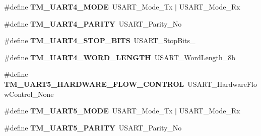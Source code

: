 \begin{DoxyCompactItemize}
\item 
\hypertarget{group___t_m___u_s_a_r_t___macros_gab965f7914474975c85cd58c8ab3790a9}{}\#define {\bfseries T\+M\+\_\+\+U\+A\+R\+T4\+\_\+\+M\+O\+D\+E}~U\+S\+A\+R\+T\+\_\+\+Mode\+\_\+\+Tx $\vert$ U\+S\+A\+R\+T\+\_\+\+Mode\+\_\+\+Rx\label{group___t_m___u_s_a_r_t___macros_gab965f7914474975c85cd58c8ab3790a9}

\item 
\hypertarget{group___t_m___u_s_a_r_t___macros_ga2fe6f1c08aaeb5dfda62a1fc4d25a4b3}{}\#define {\bfseries T\+M\+\_\+\+U\+A\+R\+T4\+\_\+\+P\+A\+R\+I\+T\+Y}~U\+S\+A\+R\+T\+\_\+\+Parity\+\_\+\+No\label{group___t_m___u_s_a_r_t___macros_ga2fe6f1c08aaeb5dfda62a1fc4d25a4b3}

\item 
\hypertarget{group___t_m___u_s_a_r_t___macros_gaf592ce1e1bf24325c1571dfbfc2dfe7e}{}\#define {\bfseries T\+M\+\_\+\+U\+A\+R\+T4\+\_\+\+S\+T\+O\+P\+\_\+\+B\+I\+T\+S}~U\+S\+A\+R\+T\+\_\+\+Stop\+Bits\+\_\label{group___t_m___u_s_a_r_t___macros_gaf592ce1e1bf24325c1571dfbfc2dfe7e}

\item 
\hypertarget{group___t_m___u_s_a_r_t___macros_ga625f045d7946725cf75b3b4df514a0bc}{}\#define {\bfseries T\+M\+\_\+\+U\+A\+R\+T4\+\_\+\+W\+O\+R\+D\+\_\+\+L\+E\+N\+G\+T\+H}~U\+S\+A\+R\+T\+\_\+\+Word\+Length\+\_\+8b\label{group___t_m___u_s_a_r_t___macros_ga625f045d7946725cf75b3b4df514a0bc}

\item 
\hypertarget{group___t_m___u_s_a_r_t___macros_gade5df316e8c6437a842e208402af4ff7}{}\#define {\bfseries T\+M\+\_\+\+U\+A\+R\+T5\+\_\+\+H\+A\+R\+D\+W\+A\+R\+E\+\_\+\+F\+L\+O\+W\+\_\+\+C\+O\+N\+T\+R\+O\+L}~U\+S\+A\+R\+T\+\_\+\+Hardware\+Flow\+Control\+\_\+\+None\label{group___t_m___u_s_a_r_t___macros_gade5df316e8c6437a842e208402af4ff7}

\item 
\hypertarget{group___t_m___u_s_a_r_t___macros_ga8f9345f41413ee4fa5f8bc9ea4c555cb}{}\#define {\bfseries T\+M\+\_\+\+U\+A\+R\+T5\+\_\+\+M\+O\+D\+E}~U\+S\+A\+R\+T\+\_\+\+Mode\+\_\+\+Tx $\vert$ U\+S\+A\+R\+T\+\_\+\+Mode\+\_\+\+Rx\label{group___t_m___u_s_a_r_t___macros_ga8f9345f41413ee4fa5f8bc9ea4c555cb}

\item 
\hypertarget{group___t_m___u_s_a_r_t___macros_ga6e59a1cf77450a0cb357511c7cc3d5af}{}\#define {\bfseries T\+M\+\_\+\+U\+A\+R\+T5\+\_\+\+P\+A\+R\+I\+T\+Y}~U\+S\+A\+R\+T\+\_\+\+Parity\+\_\+\+No\label{group___t_m___u_s_a_r_t___macros_ga6e59a1cf77450a0cb357511c7cc3d5af}


\end{DoxyCompactItemize}
